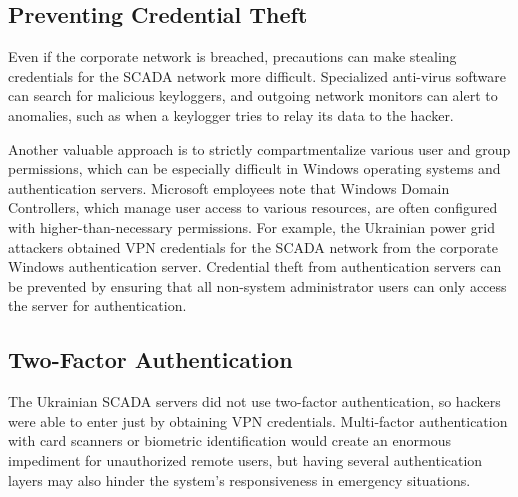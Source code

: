 \documentclass[10pt]{article}
\begin{document}
    \subsection{Preventing Credential Theft}
    Even if the corporate network is breached, precautions can make stealing credentials for the SCADA network more difficult. Specialized anti-virus software can search for malicious keyloggers, and outgoing network monitors can alert to anomalies, such as when a keylogger tries to relay its data to the hacker.
    \medskip
    
    Another valuable approach is to strictly compartmentalize various user and group permissions, which can be especially difficult in Windows operating systems and authentication servers. Microsoft employees note that Windows Domain Controllers, which manage user access to various resources, are often configured with higher-than-necessary permissions.\cite{windows} For example, the Ukrainian power grid attackers obtained VPN credentials for the SCADA network from the corporate Windows authentication server.\cite{wiredshort} Credential theft from authentication servers can be prevented by ensuring that all non-system administrator users can only access the server for authentication.\cite{windows}
    \medskip
    
    \subsection{Two-Factor Authentication}
    The Ukrainian SCADA servers did not use two-factor authentication, so hackers were able to enter just by obtaining VPN credentials. Multi-factor authentication with card scanners or biometric identification would create an enormous impediment for unauthorized remote users, but having several authentication layers may also hinder the system's responsiveness in emergency situations.\cite{nist_3-1}
    
\end{document}
